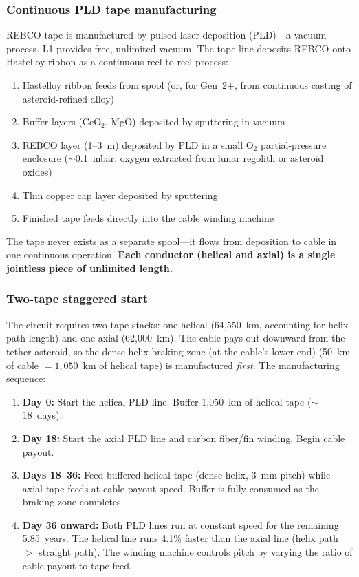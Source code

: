 \documentclass[12pt,letterpaper]{article}
\begin{document}
\subsubsection{Continuous PLD tape manufacturing}

REBCO tape is manufactured by pulsed laser deposition (PLD)---a vacuum process. L1 provides free, unlimited vacuum. The tape line deposits REBCO onto Hastelloy ribbon as a continuous reel-to-reel process:

\begin{enumerate}[nosep]
  \item Hastelloy ribbon feeds from spool (or, for Gen~2+, from continuous casting of asteroid-refined alloy)
  \item Buffer layers (CeO$_2$, MgO) deposited by sputtering in vacuum
  \item REBCO layer (1--3~\textmu m) deposited by PLD in a small O$_2$ partial-pressure enclosure (${\sim}$0.1~mbar, oxygen extracted from lunar regolith or asteroid oxides)
  \item Thin copper cap layer deposited by sputtering
  \item Finished tape feeds directly into the cable winding machine
\end{enumerate}

The tape never exists as a separate spool---it flows from deposition to cable in one continuous operation. \textbf{Each conductor (helical and axial) is a single jointless piece of unlimited length.}

\subsubsection{Two-tape staggered start}

The circuit requires two tape stacks: one helical (64{,}550~km, accounting for helix path length) and one axial (62{,}000~km). The cable pays out downward from the tether asteroid, so the dense-helix braking zone (at the cable's lower end) (50~km of cable $= 1{,}050$~km of helical tape) is manufactured \emph{first}. The manufacturing sequence:

\begin{enumerate}[nosep]
  \item \textbf{Day 0:} Start the helical PLD line. Buffer 1{,}050~km of helical tape (${\sim}$18~days).
  \item \textbf{Day 18:} Start the axial PLD line and carbon fiber/fin winding. Begin cable payout.
  \item \textbf{Days 18--36:} Feed buffered helical tape (dense helix, 3~mm pitch) while axial tape feeds at cable payout speed. Buffer is fully consumed as the braking zone completes.
  \item \textbf{Day 36 onward:} Both PLD lines run at constant speed for the remaining 5.85~years. The helical line runs 4.1\% faster than the axial line (helix path $>$ straight path). The winding machine controls pitch by varying the ratio of cable payout to tape feed.
\end{enumerate}
\end{document}
